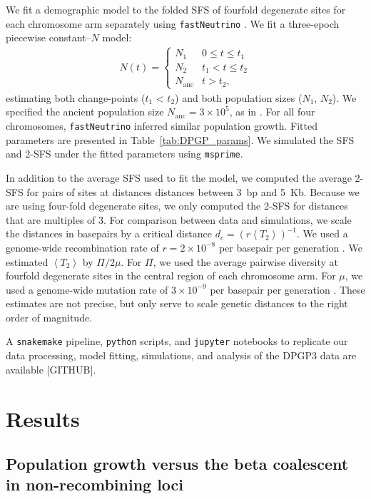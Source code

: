 \documentclass[11pt, letterpaper]{article}   	%
\newcommand{\E}[1]{\left< #1 \right>}
\begin{document}
We fit a demographic model to the folded SFS of fourfold degenerate sites for each chromosome arm separately using \texttt{fastNeutrino} \autocite{BhaskarEtAl2015}.
We fit a three-epoch piecewise constant--$N$ model:
\begin{align}
    N(t) = \begin{cases}
                N_1 & 0 \leq t \leq t_1 \\
                N_2 & t_1 <  t \leq t_2 \\
                N_{\text{anc}} & t > t_2,
            \end{cases}
    \label{eq:piecewise}
\end{align}
estimating both change-points ($t_1$ < $t_2$) and both population sizes ($N_1$, $N_2$).
We specified the ancient population size $N_{\text{anc}} = 3\times 10^5$, as in \cite{RagsdaleGutenkunst2017}.
For all four chromosomes, \texttt{fastNeutrino} inferred similar population growth.
Fitted parameters are presented in Table~\ref{tab:DPGP_params}.
We simulated the SFS and 2-SFS under the fitted parameters using \texttt{msprime}.

In addition to the average SFS used to fit the model, we computed the average 2-SFS for pairs of sites at distances distances between 3~bp and 5~Kb.
Because we are using four-fold degenerate sites, we only computed the 2-SFS for distances that are multiples of 3.
For comparison between data and simulations, we scale the distances in basepairs by a critical distance $d_c = (r\E{T_2})^{-1}$.
We used a genome-wide recombination rate of $r = 2 \times 10^{-8}$ per basepair per generation \autocite{ComeronEtAl2012}.
We estimated $\E{T_2}$ by $\Pi / 2 \mu$.
For $\Pi$, we used the average pairwise diversity at fourfold degenerate sites in the central region of each chromosome arm.
For $\mu$, we used a genome-wide mutation rate of $3 \times 10^{-9}$ per basepair per generation \autocite{KeightlyEtAl2014}.
These estimates are not precise, but only serve to scale genetic distances to the right order of magnitude.

A \texttt{snakemake} pipeline, \texttt{python} scripts, and \texttt{jupyter} notebooks to replicate our data processing, model fitting, simulations, and analysis of the DPGP3 data are available [GITHUB].

\section*{Results \label{sec:results}}

\subsection*{Population growth versus the beta coalescent in non-recombining loci}
\end{document}

